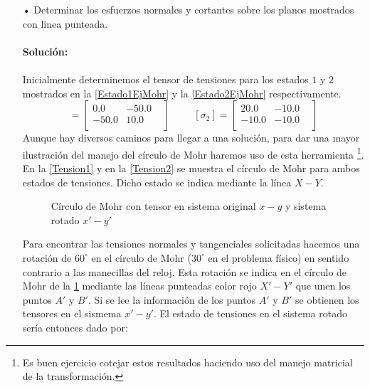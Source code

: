 \documentclass[../notas medios.tex]{subfiles}
\begin{document}
\begin{enumerate}
%
\item[•] Determinar los esfuerzos normales y cortantes sobre los planos mostrados con linea punteada. \\\\
%
\textbf{Solución:}\\\\
%
Inicialmente determinemos el tensor de tensiones para los estados $1$ y $2$
mostrados en la \cref{Estado1EjMohr} y la \cref{Estado2EjMohr} respectivamente.
%
\begin{equation*}
[\sigma_1] =
 	\begin{bmatrix}
     	0.0 & -50.0 & \\
     	-50.0 & 10.0 \\
 	\end{bmatrix}
 \hspace{1cm}
 [\sigma_2] =
 	\begin{bmatrix}
     	20.0 & -10.0 & \\
     	-10.0 & -10.0 \\
 	\end{bmatrix}
\end{equation*}
%
Aunque hay diversos caminos para llegar a una solución, para dar una mayor
ilustración del manejo del círculo de  Mohr haremos uso de esta herramienta
\footnote{Es buen ejercicio cotejar estos resultados haciendo uso del manejo
matricial de la transformación.}. En la  \cref{Tension1} y  en la \cref{Tension2}
se muestra el círculo de Mohr para ambos estados de tensiones. Dicho estado se indica mediante la línea $X-Y$.
%
\begin{figure}[H]
	\centering
		\hspace{0.5cm}
	\caption{Círculo de Mohr con tensor en sistema original $x-y$ y sistema rotado
	$x'-y'$ }
	\label{Tensiones}
\end{figure}
%
Para encontrar las tensiones normales y tangenciales solicitadas hacemos una
rotación de $60^{\circ}$ en el círculo de Mohr ($30^{\circ}$ en el problema
físico) en sentido contrario a las manecillas del reloj. Esta rotación se indica
en el círculo de Mohr de la \cref{Tensiones} mediante las líneas punteadas
color rojo $X'-Y'$ que unen los puntos $A'$ y $B'$. Si se lee la información
de los puntos $A'$ y $B'$ se obtienen los tensores en el sismema $x'-y'$. El
estado de tensiones en el sistema rotado sería entonces dado por:

\end{enumerate}
\end{document}
